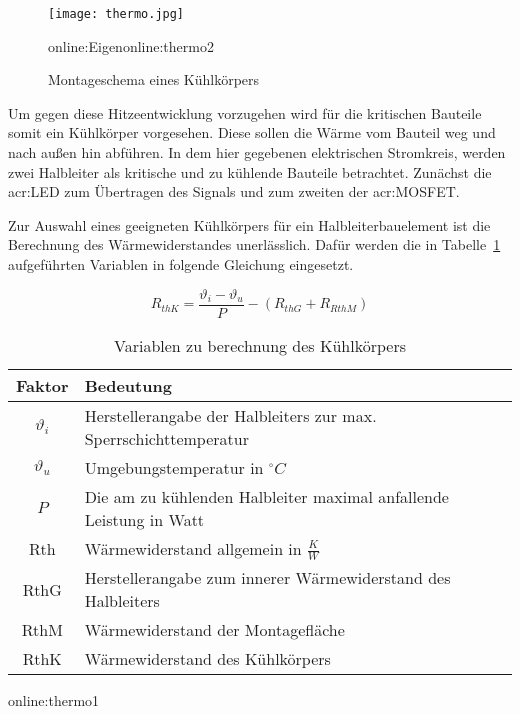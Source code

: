\begin{figure}[H]
	\centering
	\texttt{[image: thermo.jpg]}
	\caption[Montageschema eines Kühlkörpers]{Montageschema eines Kühlkörpers} \gls{online:Eigen}\gls{online:thermo2}
	\label{fig:thermo}
\end{figure}

Um gegen diese Hitzeentwicklung vorzugehen wird für die kritischen Bauteile somit ein Kühlkörper vorgesehen. Diese sollen die Wärme vom Bauteil weg und nach außen hin abführen. In dem hier gegebenen elektrischen Stromkreis, werden zwei Halbleiter als kritische und zu kühlende Bauteile betrachtet. Zunächst die \gls{acr:LED} zum Übertragen des Signals und zum zweiten der \gls{acr:MOSFET}.\cite{thermLED}

Zur Auswahl eines geeigneten Kühlkörpers für ein Halbleiterbauelement ist die Berechnung des Wärmewiderstandes unerlässlich. Dafür werden die in Tabelle~\ref{tab:thermofaktoren} aufgeführten Variablen in folgende Gleichung eingesetzt.

\begin{equation}
	\label{equ:thermo}
	R_{thK} = \frac{\vartheta_{i}-\vartheta_{u}}{P}-(R_{thG}+R_{RthM})
\end{equation}

\begin{table}[htb]
	\begin{center}
		\begin{tabular}[h]{c|l}	
			
			Faktor & Bedeutung \\
			\hline
			$\vartheta_{i}$& Herstellerangabe der Halbleiters zur max. Sperrschichttemperatur\\
			$\vartheta_{u}$& Umgebungstemperatur in $^\circ C$ \\
			$P$ &  Die am zu kühlenden Halbleiter maximal anfallende Leistung in Watt\\
			Rth & Wärmewiderstand allgemein in $\frac{K}{W}$ \\
			RthG & Herstellerangabe zum innerer Wärmewiderstand des Halbleiters \\
			RthM & Wärmewiderstand der Montagefläche \\
			RthK &  Wärmewiderstand des Kühlkörpers \\
			
		\end{tabular}
		\caption{Variablen zu berechnung des Kühlkörpers}\gls{online:thermo1}
		\label{tab:thermofaktoren}
	\end{center}
\end{table}


